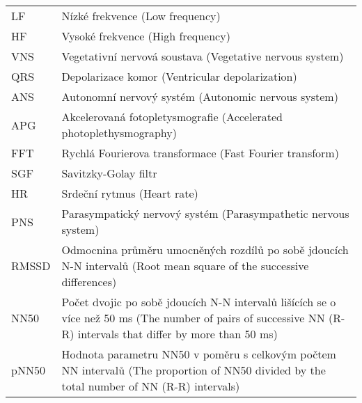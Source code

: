 \begin{table}[h]
\begin{center}
\begin{tabular}{p{2.5cm}p{12.25cm}}
			LF      & Nízké frekvence (Low frequency)                                                                                                                               \\
			HF      & Vysoké frekvence (High frequency)                                                                                                                             \\
			VNS     & Vegetativní nervová soustava (Vegetative nervous system)                                                                                                      \\
			QRS     & Depolarizace komor (Ventricular depolarization)                                                                                                               \\
			ANS     & Autonomní nervový systém (Autonomic nervous system)                                                                                                           \\
			APG     & Akcelerovaná fotopletysmografie (Accelerated photoplethysmography)                                                                                            \\
			FFT     & Rychlá Fourierova transformace (Fast Fourier transform)                                                                                                       \\
			SGF     & Savitzky-Golay filtr                                                                                                                                          \\
			HR      & Srdeční rytmus (Heart rate)                                                                                                                                   \\
			PNS     & Parasympatický nervový systém (Parasympathetic nervous system)                                                                                                \\
			RMSSD   & Odmocnina průměru umocněných rozdílů po sobě jdoucích N-N intervalů (Root mean square of the successive differences)                                           \\
			NN50    & Počet dvojic po sobě jdoucích N-N intervalů lišících se o více než 50 ms (The number of pairs of successive NN (R-R) intervals that differ by more than 50 ms) \\
			pNN50   & Hodnota parametru NN50 v poměru s celkovým počtem NN intervalů (The proportion of NN50 divided by the total number of NN (R-R) intervals)                     \\

\end{tabular}
\end{center}
\end{table}
